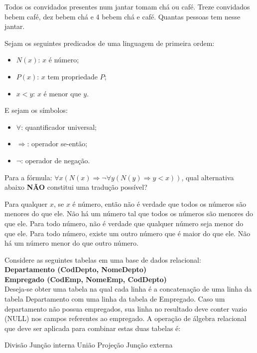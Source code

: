 \documentclass[12pt, addpoints]{exam}
\begin{document}
\begin{questions}
\question
Todos os convidados presentes num jantar tomam chá ou café. Treze convidados bebem café, dez bebem chá e 4 bebem chá e café. Quantas pessoas tem nesse jantar.

\begin{choices}
\end{choices}

\question
Sejam os seguintes predicados de uma linguagem de primeira ordem:

\begin{itemize}
    \item \( N(x) \): \( x \) é número;
    \item \( P(x) \): \( x \) tem propriedade \( P \);
    \item \( x < y \): \( x \) é menor que \( y \).
\end{itemize}

E sejam os símbolos:
\begin{itemize}
    \item \( \forall \): quantificador universal;
    \item \( \Rightarrow \): operador se-então;
    \item \( \neg \): operador de negação.
\end{itemize}

Para a fórmula: \( \forall x (N(x) \Rightarrow \neg \forall y (N(y) \Rightarrow y < x)) \), qual alternativa abaixo \textbf{NÃO} constitui uma tradução possível?

\begin{choices}
\choice Para qualquer \( x \), se \( x \) é número, então não é verdade que todos os números são menores do que ele.
\choice Não há um número tal que todos os números são menores do que ele.
\choice Para todo número, não é verdade que qualquer número seja menor do que ele.
\choice Para todo número, existe um outro número que é maior do que ele.
\choice Não há um número menor do que outro número.
\end{choices}

\question
Considere as seguintes tabelas em uma base de dados relacional:\\
\textbf{Departamento (CodDepto, NomeDepto)}\\
\textbf{Empregado (CodEmp, NomeEmp, CodDepto)}\\
Deseja-se obter uma tabela na qual cada linha é a concatenação de uma linha da tabela Departamento com uma linha da tabela de Empregado. Caso um departamento não possua empregados, sua linha no resultado deve conter vazio (NULL) nos campos referentes ao empregado. A operação de álgebra relacional que deve ser aplicada para combinar estas duas tabelas é:
\begin{choices}
\choice Divisão
\choice Junção interna
\choice União
\choice Projeção
\choice Junção externa
\end{choices}


\end{questions}
\end{document}
